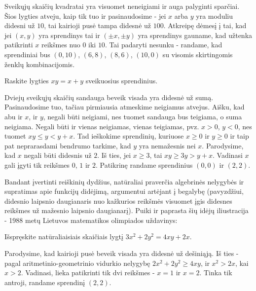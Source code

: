 \begin{sprendimas}
  Sveikųjų skaičių kvadratai yra visuomet neneigiami ir auga palyginti
  sparčiai. Šios lygties atveju, kaip tik tuo ir pasinaudosime - jei $x$ arba
  $y$ yra moduliu didesni už $10$, tai kairioji pusė tampa didesnė už
  $100$. Atkreipę dėmesį į tai, kad jei $(x,y)$ yra sprendinys tai ir
  $(\pm x,\pm y)$ yra sprendinys gauname, kad užtenka patikrinti $x$ 
  reikšmes nuo $0$ iki $10$. Tai padaryti nesunku - randame, kad sprendiniai
  bus $(0,10)$, $(6,8)$, $(8,6)$, $(10,0)$ su visomis skirtingomis ženklų
  kombinacijomis. 
\end{sprendimas}

\begin{pav}
  Raskite lygties $xy = x+y$ sveikuosius sprendinius.
\end{pav}

\begin{sprendimas}
  Dviejų sveikųjų skaičių sandauga beveik visada yra didesnė už sumą.
  Pasinaudosime tuo, tačiau pirmiausia atmeskime neigiamus atvejus. Aišku,
  kad abu ir $x$, ir $y$, negali būti neigiami, nes tuomet sandauga bus
  teigiama, o suma neigiama. Negali būti ir vienas neigiamas, vienas
  teigiamas, pvz. $x>0$, $y<0$, nes tuomet $xy \leq y < y + x$. Tad ieškokime
  sprendinių, kuriuose $x\geq 0$ ir $y\geq 0$ ir taip pat neprarasdami
  bendrumo tarkime, kad $y$ yra nemažesnis nei $x$. Parodysime, kad
  $x$ negali būti didesnis už $2$. Iš ties, jei $x\geq 3$, tai $xy \geq 3y >
  y + x$. Vadinasi $x$ gali įgyti tik reikšmes $0$, $1$ ir $2$. Patikrinę
  randame sprendinius $(0,0)$ ir $(2,2)$.
\end{sprendimas}

Bandant įvertinti reiškinių dydžius, natūraliai praverčia algebrinės
nelygybės ir supratimas apie funkcijų didėjimą, argumentui artėjant į
begalybę (pavyzdžiui, didesnio laipsnio daugianaris nuo kažkurios reikšmės
visuomet įgis didesnes reikšmes už mažesnio laipsnio daugianarį). Puiki ir
paprasta šių idėjų iliustracija - 1988 metų Lietuvos matematikos olimpiados
uždavinys:
\begin{pav} \text{\emph{[LitMo 1988]}} Išspręskite natūraliaisiais skaičiais lygtį
  $3x^2 + 2y^2 = 4xy + 2x.$
\end{pav}
\begin{sprendimas}
  Parodysime, kad kairioji pusė beveik visada yra didesnė už dešiniąją. Iš
  ties - pagal aritmetinio-geometrinio vidurkio nelygybę $2x^2 +
  2y^2 \geq 4xy$, ir $x^2 > 2x$, kai $x>2$. Vadinasi, lieka patikrinti tik
  dvi reikšmes - $x=1$ ir $x=2$. Tinka tik antroji, randame sprendinį
  $(2,2)$.
\end{sprendimas}

